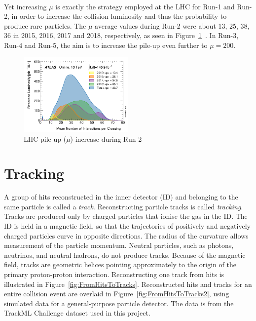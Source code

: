 \ \\Yet increasing $\mu$ is exactly the strategy employed at the LHC for Run-1 and Run-2, in order to increase the collision luminosity and thus the probability to produce rare particles. The $\mu$ average values during Run-2 were about 13, 25, 38, 36 in 2015, 2016, 2017 and 2018, respectively, as seen in Figure~\ref{fig:LHCPileup}~\cite{ATLASPileup}. In Run-3, Run-4 and Run-5, the aim is to increase the pile-up even further to $\mu=200$.

\begin{figure}[!htb]
  \centering
  \includegraphics[width=0.5\textwidth]{plots/ATLAS_mu_2015_2018.png} 
  \caption{LHC pile-up ($\mu$) increase during Run-2~\cite{ATLASPileup}}
  \label{fig:LHCPileup}
\end{figure}

\section{Tracking}
\label{sec:Tracking}

A group of hits reconstructed in the inner detector (ID) and belonging to the same particle is called a \emph{track}. Reconstructing particle tracks is called \emph{tracking}. Tracks are produced only by charged particles that ionise the gas in the ID. The ID is held in a magnetic field, so that the trajectories of positively and negatively charged particles curve in opposite directions. The radius of the curvature allows measurement of the particle momentum. Neutral particles, such as photons, neutrinos, and neutral hadrons, do not produce tracks. Because of the magnetic field, tracks are geometric helices pointing approximately to the origin of the primary proton-proton interaction. Reconstructing one track from hits is illustrated in Figure~\ref{fig:FromHitsToTracks}. Reconstructed hits and tracks for an entire collision event are overlaid in Figure~\ref{fig:FromHitsToTracks2}, using simulated data for a general-purpose particle detector. The data is from the TrackML Challenge dataset used in this project. 

